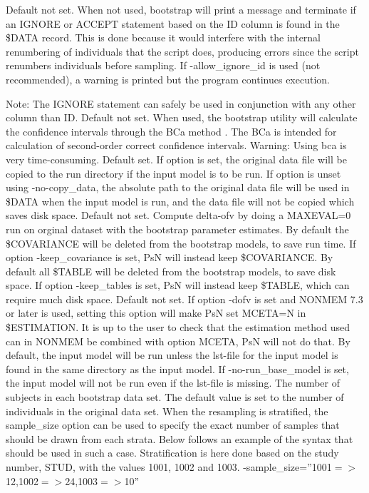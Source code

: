 \begin{optionlist}
Default not set. When not used, bootstrap will print a message and terminate if an IGNORE or ACCEPT statement based on the ID column is found in the \$DATA record. This is done because it would interfere with the internal renumbering of individuals that the script does, producing errors since the script renumbers individuals before sampling. If -allow\_ignore\_id is used (not recommended), a warning is printed but the program continues execution. 

Note: The IGNORE statement can safely be used in conjunction with any other column than ID.
\nextopt
{}
Default not set. When used, the bootstrap utility will calculate the confidence intervals through the BCa method \cite{Efron}. The BCa is intended for calculation of second-order correct confidence intervals. Warning: Using bca is very time-consuming. 
\nextopt
{}
Default set. If option is set, the original data file will be copied to the run directory if the input model is to be run. If option is unset using -no-copy\_data, the absolute path to the original data file will be used in \$DATA when the input model is run, and the data file will not be copied which saves disk space.
\nextopt
{}
Default not set. Compute delta-ofv by doing a MAXEVAL=0 run on orginal dataset with the bootstrap parameter estimates.
\nextopt
{}
By default the \$COVARIANCE will be deleted from the bootstrap models, to save run time. If option -keep\_covariance is set, PsN will instead keep \$COVARIANCE.
\nextopt
{}
By default all \$TABLE will be deleted from the bootstrap models, to save disk space. If option -keep\_tables is set, PsN will instead keep \$TABLE, which can require much disk space.
\nextopt
{}
Default not set. If option -dofv is set and NONMEM 7.3 or later is used, setting this option will make PsN set MCETA=N in \$ESTIMATION. It is up to the user to check that the estimation method used can in NONMEM be combined with option MCETA, PsN will not do that.
\nextopt
{}
By default, the input model will be run unless the lst-file for the input model is found in the same directory as the input model. If -no-run\_base\_model  is set, the input model will not be run even if the lst-file is missing.
\nextopt
{}
The number of subjects in each bootstrap data set. The default value is set to the number of individuals in the original data set. When the resampling is stratified, the sample\_size option can be used to specify the exact number of samples that should be drawn from each strata. Below follows an example of the syntax that should be used in such a case. Stratification is here done based on the study number, STUD, with the values 1001, 1002 and 1003. -sample\_size=''1001$=>$12,1002$=>$24,1003$=>$10''                          

\end{optionlist}
